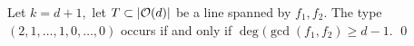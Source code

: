 %

%



\begin{corollary} \label{condition-nongeneral}
	Let $k=d+1,$ let $T\subset \lvert\mathcal{O} (d)\rvert$ be a line spanned by $f_1,f_2$. The type $(2,1,\dotsc,1,0,\dotsc,0)$ occurs if and only if $\deg (\gcd(f_1,f_2) \geq d-1$. \qed
\end{corollary}